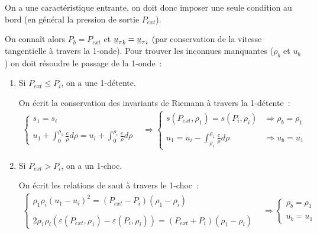 On a une caractéristique entrante,
on doit donc imposer une seule condition  au bord
(en général la pression de sortie $P_{ext}$).

On connaît alors $P_b = P_{ext}$ et ${\underline{u}_\tau}_b = {\underline{u}_\tau}_i$
(par conservation de la vitesse tangentielle à travers la 1-onde).
Pour trouver les inconnues manquantes ($\rho_b$ et $u_b$)
on doit résoudre le passage de la 1-onde~:

\begin{enumerate}

\item Si $P_{ext} \leqslant P_i$,
on a une 1-détente.

On écrit la conservation
des invariants de Riemann à travers la 1-détente~:
\begin{equation}
\begin{array}{lll}
\left\{\begin{array}{l}
s_1 = s_i\\
\\
u_1 + \displaystyle\int_0^{\rho_1} \frac{c}{\rho} d\rho
= u_i + \displaystyle\int_0^{\rho_i} \frac{c}{\rho} d\rho
\end{array}\right.
&
\Rightarrow
\left\{\begin{array}{ll}
s(P_{ext},\rho_1) = s(P_i,\rho_i)
& \Rightarrow \rho_b=\rho_1\\
\\
u_1 = u_i - \displaystyle\int_{\rho_i}^{\rho_1} \frac{c}{\rho} d\rho
& \Rightarrow u_b = u_1
\end{array}\right.
\end{array}
\end{equation}

\item Si $P_{ext} > P_i$,
on a un 1-choc.

On écrit les relations de saut à travers le 1-choc~:
\begin{equation}
\begin{array}{lll}
\left\{\begin{array}{l}
\rho_1 \rho_i (u_1 - u_i)^2
= (P_{ext} - P_i)(\rho_1 - \rho_i)\\
\\
2\rho_1 \rho_i (\varepsilon(P_{ext},\rho_1) - \varepsilon(P_i,\rho_i))
= (P_{ext} + P_i)(\rho_1 - \rho_i)
\end{array}\right.
&
\Rightarrow
\left\{\begin{array}{l}
\rho_b=\rho_1\\
\\
u_b = u_1
\end{array}\right.
\end{array}
\end{equation}


\end{enumerate}
